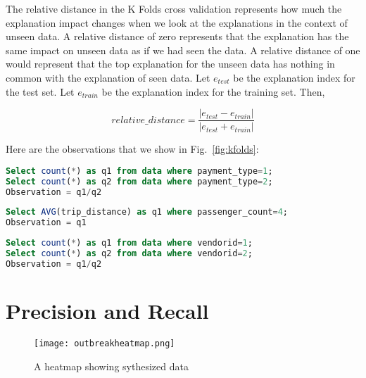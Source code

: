 The relative distance in the K Folds cross validation represents how much the explanation impact changes when we look at the explanations in the context of unseen data. A relative distance of zero represents that the explanation has the same impact on unseen data as if we had seen the data. A relative distance of one would represent that the top explanation for the unseen data has nothing in common with the explanation of seen data. Let $e_{test}$ be the explanation index for the test set. Let $e_{train}$ be the explanation index for the training set. Then,

$$relative\_distance = \frac{|e_{test}-e_{train}|}{|e_{test}+e_{train}|}$$

Here are the observations that we show in Fig.~\ref{fig:kfolds}:
\renewcommand{\lstlistingname}{Query}%
\begin{lstlisting}[language=SQL, caption=o1 for Fig.~\ref{fig:kfolds}, label=qry:o1]
Select count(*) as q1 from data where payment_type=1;
Select count(*) as q2 from data where payment_type=2;
Observation = q1/q2
\end{lstlisting}

\begin{lstlisting}[language=SQL, caption=o2 for Fig.~\ref{fig:kfolds}, label=qry:o2]
Select AVG(trip_distance) as q1 where passenger_count=4;
Observation = q1
\end{lstlisting}

\begin{lstlisting}[language=SQL, caption=o3 for Fig.~\ref{fig:kfolds}, label=qry:o3]
Select count(*) as q1 from data where vendorid=1;
Select count(*) as q2 from data where vendorid=2;
Observation = q1/q2
\end{lstlisting}

\section{Precision and Recall}
\begin{wrapfigure}{L}{0.5\textwidth}
  \begin{center}
    \texttt{[image: outbreakheatmap.png]}
  \end{center}
  \caption{A heatmap showing sythesized data}
  \label{fig:synthesized_data}
\end{wrapfigure}

